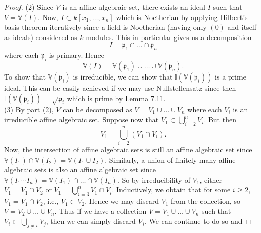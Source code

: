 \documentclass[reqno]{amsart}
\theoremstyle{definition}
\theoremstyle{remark}
\begin{document}
\begin{proof}
        (2) Since $V$ is an affine algebraic set,
        there exists an ideal $I$ such that
        $V = \mathbb{V}(I)$. Now,
        $I \subset k\left[ x_1, \ldots, x_n \right] $ which
        is Noetherian by applying
        Hilbert's basis theorem
        iteratively since a field is Noetherian (having
        only $\left( 0 \right) $ and itself as ideals) considered
        as $k$-modules. This in particular
        gives us a decomposition
        \[
        I = \mathfrak{p}_1 \cap \ldots \cap
        \mathfrak{p}_n
        \] 
        where each $\mathfrak{p}_i$ is primary. Hence
        \[
        \mathbb{V}(I)
        = \mathbb{V}(\mathfrak{p}_1) \cup 
        \ldots \cup 
        \mathbb{V}\left( \mathfrak{p}_n \right) .
        \] 
        To show that
        $\mathbb{V}\left( \mathfrak{p}_i \right) $ 
        is irreducible, we can
        show that
        $\mathbb{I} \left( \mathbb{V}
        \left( \mathfrak{p}_i \right) \right) $ is a
        prime ideal.
        This can be easily achieved if we may use
        Nullstellensatz since then
        $\mathbb{I} \left( \mathbb{V}\left( 
        \mathfrak{p}_i\right)  \right) 
        = \sqrt{\mathfrak{p}_i} 
        $ which is prime by Lemma 7.11.\\
        \linebreak
        (3) By part (2), 
        $V$ can be decomposed as
        $V = V_1 \cup \ldots \cup  V_n$ where
        each $V_i$ is an irreducible affine
        algebraic set. Suppose now that
        $V_1 \subset \bigcup_{i=2}^{n}V_i $.
        But then
        \[
        V_1 = \bigcup_{i=2}^{n} \left( V_1 \cap
        V_i \right).
        \] 
        Now, the intersection of affine algebraic sets
        is still an affine algebraic set since
        $\mathbb{V}(I_1) \cap
        \mathbb{V}(I_2) = 
        \mathbb{V}\left( I_1 \cup I_2 \right) $.
       Similarly, a union of finitely many affine
       algebraic sets is also an affine algebraic set since
       $\mathbb{V}(I_1 \cdots I_n)
       = \mathbb{V}(I_1) \cap \ldots \cap
       \mathbb{V}(I_n)$.
       So by irreducibility of $V_1$, either
       $V_1 = V_1 \cap V_2$ or
       $V_1 = \bigcup_{i=3}^{n} V_1 \cap V_i$.
       Inductively, we obtain that for some
       $i\ge 2$, 
       $V_1 = V_1 \cap V_2$, i.e., 
       $V_1 \subset  V_2$. Hence we may
       discard $ V_1$ from the collection, so
       $V = V_2 \cup  \ldots \cup  V_n$.
       Thus if we have a collection 
       $V = V_1 \cup \ldots \cup  V_n$ such that
       $V_i \subset \bigcup_{j\neq i} V_j$, then we
       can simply discard $V_i$. We can continue to do so and

\end{proof}
\end{document}

